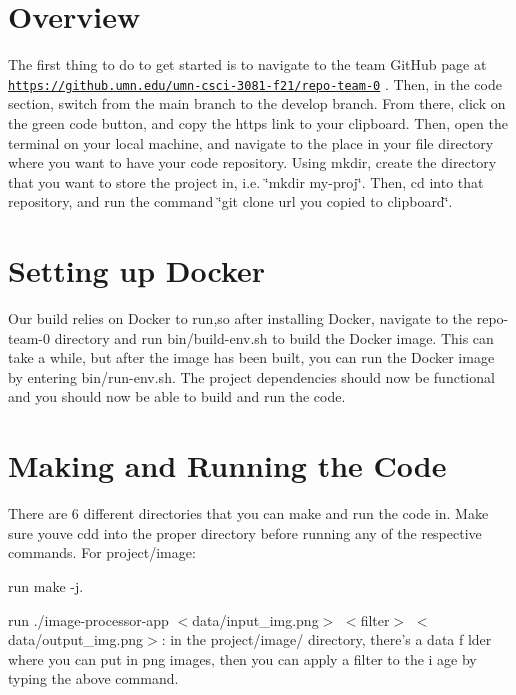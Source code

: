 \hypertarget{getting_started_overview_section}{}\section{Overview}\label{getting_started_overview_section}
The first thing to do to get started is to navigate to the team Git\+Hub page at \href{https://github.umn.edu/umn-csci-3081-f21/repo-team-0}{\tt https\+://github.\+umn.\+edu/umn-\/csci-\/3081-\/f21/repo-\/team-\/0} . Then, in the code section, switch from the \textquotesingle{}main\textquotesingle{} branch to the \textquotesingle{}develop\textquotesingle{} branch. From there, click on the green \textquotesingle{}code\textquotesingle{} button, and copy the https link to your clipboard. Then, open the terminal on your local machine, and navigate to the place in your file directory where you want to have your code repository. Using mkdir, create the directory that you want to store the project in, i.\+e. \char`\"{}mkdir
\textquotesingle{}my-\/proj\textquotesingle{}\char`\"{}. Then, cd into that repository, and run the command \char`\"{}git clone
\textquotesingle{}url you copied to clipboard\textquotesingle{}\char`\"{}.\hypertarget{getting_started_setting_docker}{}\section{Setting up Docker}\label{getting_started_setting_docker}
Our build relies on Docker to run,so after installing Docker, navigate to the repo-\/team-\/0 directory and run \textquotesingle{}bin/build-\/env.\+sh\textquotesingle{} to build the Docker image. This can take a while, but after the image has been built, you can run the Docker image by entering \textquotesingle{}bin/run-\/env.\+sh\textquotesingle{}. The project dependencies should now be functional and you should now be able to build and run the code.\hypertarget{getting_started_making_running}{}\section{Making and Running the Code}\label{getting_started_making_running}
There are 6 different directories that you can make and run the code in. Make sure you\textquotesingle{}ve cd\textquotesingle{}d into the proper directory before running any of the respective commands. For project/image\+:


\begin{DoxyEnumerate}
\item run \textquotesingle{}make -\/j\textquotesingle{}.
\item run \textquotesingle{}./image-\/processor-\/app $<$data/input\+\_\+img.\+png$>$ $<$filter$>$ $<$data/output\+\_\+img.\+png$>$\textquotesingle{}\+: in the project/image/ directory, there’s a data f lder where you can put in png images, then you can apply a filter to the i age by typing the above command.
\end{DoxyEnumerate}

